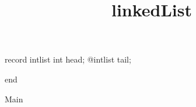 \documentclass[8pt]{article}
\title{linkedList}
\begin{document}
\maketitle
record intlist int head;
@intlist tail;

end


\begin{algorithm}[H]

\caption{Main}
\end{algorithm}
\end{document}
